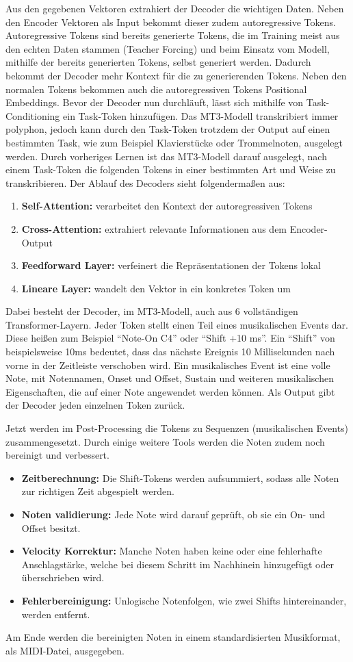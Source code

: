 Aus den gegebenen Vektoren extrahiert der Decoder die wichtigen Daten.
Neben den Encoder Vektoren als Input bekommt dieser zudem autoregressive Tokens.
Autoregressive Tokens sind bereits generierte Tokens,
die im Training meist aus den echten Daten stammen (Teacher Forcing)
und beim Einsatz vom Modell, mithilfe der bereits generierten Tokens, selbst generiert werden.
Dadurch bekommt der Decoder mehr Kontext für die zu generierenden Tokens.
Neben den normalen Tokens bekommen auch die autoregressiven Tokens Positional Embeddings.
Bevor der Decoder nun durchläuft, lässt sich mithilfe von Task-Conditioning ein Task-Token hinzufügen.
Das MT3-Modell transkribiert immer polyphon, jedoch kann durch den Task-Token trotzdem der Output auf
einen bestimmten Task, wie zum Beispiel Klavierstücke oder Trommelnoten, ausgelegt werden.
Durch vorheriges Lernen ist das MT3-Modell darauf ausgelegt,
nach einem Task-Token die folgenden Tokens in einer bestimmten Art und Weise zu transkribieren.
Der Ablauf des Decoders sieht folgendermaßen aus:
\begin{enumerate}
  \item \textbf{Self-Attention:} verarbeitet den Kontext der autoregressiven Tokens
  \item \textbf{Cross-Attention:} extrahiert relevante Informationen aus dem Encoder-Output
  \item \textbf{Feedforward Layer:} verfeinert die Repräsentationen der Tokens lokal
  \item \textbf{Lineare Layer:} wandelt den Vektor in ein konkretes Token um
\end{enumerate}
Dabei besteht der Decoder, im MT3-Modell, auch aus 6 vollständigen Transformer-Layern.
Jeder Token stellt einen Teil eines musikalischen Events dar.
Diese heißen zum Beispiel \enquote{Note-On C4} oder \enquote{Shift +10 ms}.
Ein \enquote{Shift} von beispielsweise 10ms bedeutet, dass das nächste Ereignis 10 Millisekunden nach vorne in der Zeitleiste verschoben wird.
Ein musikalisches Event ist eine volle Note, mit Notennamen, Onset und Offset,
Sustain und weiteren musikalischen Eigenschaften, die auf einer Note angewendet werden können.
Als Output gibt der Decoder jeden einzelnen Token zurück.

Jetzt werden im Post-Processing die Tokens zu Sequenzen (musikalischen Events) zusammengesetzt.
Durch einige weitere Tools werden die Noten zudem noch bereinigt und verbessert.
\begin{itemize}
  \item \textbf{Zeitberechnung:} Die Shift-Tokens werden aufsummiert, sodass alle Noten zur richtigen Zeit abgespielt werden.
  \item \textbf{Noten validierung:} Jede Note wird darauf geprüft, ob sie ein On- und Offset besitzt.
  \item \textbf{Velocity Korrektur:} Manche Noten haben keine oder eine fehlerhafte Anschlagstärke, welche bei diesem Schritt im Nachhinein hinzugefügt oder überschrieben wird.
  \item \textbf{Fehlerbereinigung:} Unlogische Notenfolgen, wie zwei Shifts hintereinander, werden entfernt.
\end{itemize}
Am Ende werden die bereinigten Noten in einem standardisierten Musikformat, als MIDI-Datei, ausgegeben.

